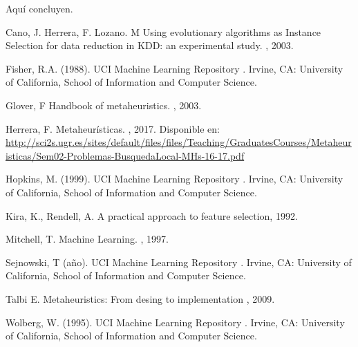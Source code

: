 \documentclass{ci5652}
\begin{document}
Aquí concluyen.


\small


\begin{thebibliography}{99}

Cano, J. Herrera, F. Lozano. M
\newblock Using evolutionary algorithms as Instance Selection for data
reduction in KDD: an experimental study.
, 2003.

Fisher, R.A. (1988). UCI Machine Learning Repository 
.
\newblock Irvine, CA: University of California, School of Information and Computer Science.

Glover, F
\newblock Handbook of metaheuristics. 
, 2003.

Herrera, F.
\newblock Metaheurísticas. 
, 2017. Disponible en: 
\url{http://sci2s.ugr.es/sites/default/files/files/Teaching/GraduatesCourses/Metaheuristicas/Sem02-Problemas-BusquedaLocal-MHs-16-17.pdf}

Hopkins, M. (1999). UCI Machine Learning Repository 
.
\newblock Irvine, CA: University of California, School of Information and Computer Science.

Kira, K., Rendell, A.
\newblock A practical approach to feature selection, 1992.

Mitchell, T.
\newblock Machine Learning.
, 1997.

Sejnowski, T (año). UCI Machine Learning Repository 
.
\newblock Irvine, CA: University of California, School of Information and Computer Science.

Talbi E.
\newblock Metaheuristics: From desing to implementation
, 2009.

Wolberg, W. (1995). UCI Machine Learning Repository 
.
\newblock Irvine, CA: University of California, School of Information and Computer Science.

%
\end{thebibliography}
\end{document}
